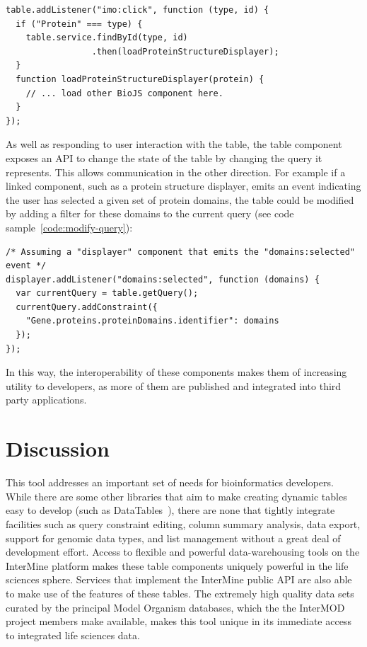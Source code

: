 \documentclass[10pt,a4paper,twocolumn]{article}
\begin{document}
\begin{lstlisting}[caption={Integrating with Other Components - Example 1}, label={code:integration}]
table.addListener("imo:click", function (type, id) {
  if ("Protein" === type) {
    table.service.findById(type, id)
                 .then(loadProteinStructureDisplayer);
  }
  function loadProteinStructureDisplayer(protein) {
    // ... load other BioJS component here.
  }
});
\end{lstlisting}

As well as responding to user interaction with the table, the table component
exposes an API to change the state of the table by changing the query it
represents. This allows communication in the other direction. For example if a
linked component, such as a protein structure displayer, emits an event
indicating the user has selected a given set of protein domains, the table could
be modified by adding a filter for these domains to the current query (see code
sample~\ref{code:modify-query}):

\begin{lstlisting}[caption={Integrating with Other Components - Example 2}, label={code:modify-query}]
/* Assuming a "displayer" component that emits the "domains:selected" event */
displayer.addListener("domains:selected", function (domains) {
  var currentQuery = table.getQuery();
  currentQuery.addConstraint({
    "Gene.proteins.proteinDomains.identifier": domains
  });
});
\end{lstlisting}

In this way, the interoperability of these components makes them of increasing
utility to developers, as more of them are published and integrated into third
party applications.

\section*{Discussion}

This tool addresses an important set of needs for bioinformatics developers.
While there are some other libraries that aim to make creating dynamic tables
easy to develop (such as DataTables~\cite{site:datatables}), there are none that
tightly integrate facilities such as query constraint editing, column summary
analysis, data export, support for genomic data types, and list management
without a great deal of development effort. Access to flexible and powerful
data-warehousing tools on the InterMine platform makes these table components
uniquely powerful in the life sciences sphere. Services that implement the
InterMine public API are also able to make use of the features of these tables.
The extremely high quality data sets curated by the principal Model Organism
databases, which the the InterMOD project members make available, makes this
tool unique in its immediate access to integrated life sciences data. 
\end{document}
